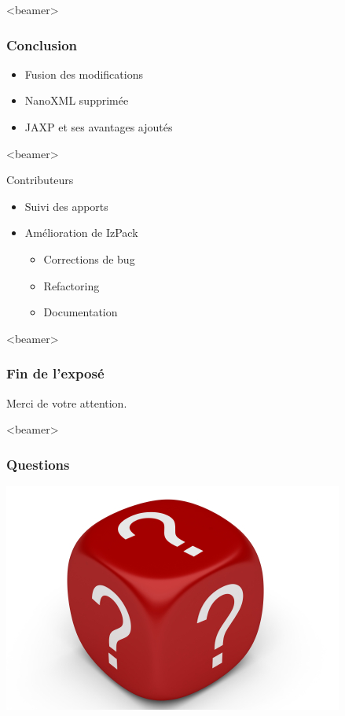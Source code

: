 \begin{frame}<beamer>
\frametitle{Conclusion}
\begin{itemize}
	\item Fusion des modifications
	\item NanoXML supprimée
	\item JAXP et ses avantages ajoutés
\end{itemize}
\end{frame}
\begin{frame}<beamer>
\begin{beamerboxesrounded}[shadow=true]{Contributeurs}
\begin{itemize}
	\item Suivi des apports
	\item Amélioration de IzPack
	\begin{itemize}
		\item Corrections de bug
		\item Refactoring
		\item Documentation
	\end{itemize}
\end{itemize}
\end{beamerboxesrounded}
\end{frame}
\begin{frame}<beamer>\frametitle{Fin de l'exposé}
\begin{center}
\LARGE Merci de votre attention.
\end{center}
\end{frame}
\begin{frame}<beamer>\frametitle{Questions}
\begin{center}
\includegraphics[width=.6\linewidth]{../image/questionMark.jpg}
\end{center}
\end{frame}

